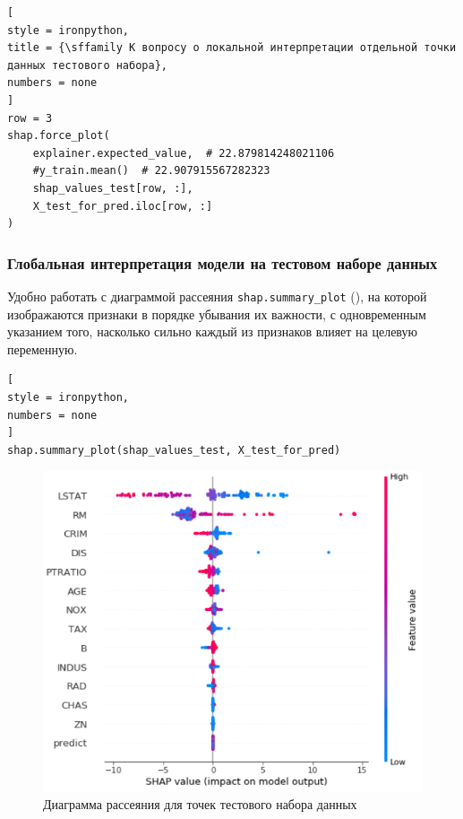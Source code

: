 \documentclass[%
	11pt,
	a4paper,
	utf8,
		]{article}
\begin{document}
\begin{lstlisting}[
style = ironpython,
title = {\sffamily К вопросу о локальной интерпретации отдельной точки данных тестового набора},
numbers = none
]
row = 3
shap.force_plot(
    explainer.expected_value,  # 22.879814248021106
    #y_train.mean()  # 22.907915567282323
    shap_values_test[row, :],
    X_test_for_pred.iloc[row, :]
)
\end{lstlisting}

\subsubsection{Глобальная интерпретация модели на тестовом наборе данных}

Удобно работать с диаграммой рассеяния \texttt{shap.summary\_plot} (), на которой изображаются признаки в порядке убывания их важности, с одновременным указанием того, насколько сильно каждый из признаков влияет на целевую переменную.

\begin{lstlisting}[
style = ironpython,
numbers = none
]
shap.summary_plot(shap_values_test, X_test_for_pred)
\end{lstlisting}

\begin{figure}[h]
	\centering
	\includegraphics[scale=0.85]{figures/summary_plt_test.png}
	\caption{ Диаграмма рассеяния для точек тестового набора данных }\label{fig:summary_plt_test}
\end{figure}
\end{document}
